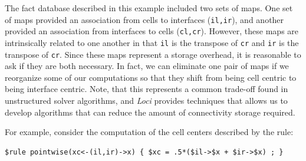 \documentclass[10pt,epsf,letterpaper,twoside]{book}
\begin{document}
The fact database described in this example included two sets of
maps.  One set of maps provided an association from cells to
interfaces ({\tt il,ir}), and another provided an association from
interfaces to cells ({\tt cl,cr}).  However, these maps are
intrinsically related to one another in that {\tt il} is the transpose
of {\tt cr} and {\tt ir} is the transpose of {\tt cr}.  Since these
maps represent a storage overhead, it is reasonable to ask if they are
both necessary.  In fact, we can eliminate one pair of maps if we
reorganize some of our computations so that they shift from being cell
centric to being interface centric.  Note, that this represents a
common trade-off found in unstructured solver algorithms, and {\it Loci}
provides techniques that allows us to develop algorithms that can
reduce the amount of connectivity storage required.  

For example, consider the computation of the cell centers described
by the rule:
\begin{verbatim}
$rule pointwise(xc<-(il,ir)->x) { $xc = .5*($il->$x + $ir->$x) ; }
\end{verbatim}
\end{document}
